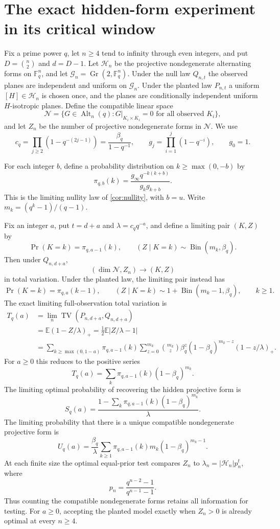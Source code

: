 \section{The exact hidden-form experiment in its critical window}

Fix a prime power $q$, let $n\ge4$ tend to infinity through even integers, and
put $D=\binom n2$ and $d=D-1$. Let $\mathcal H_n$ be the projective
nondegenerate alternating forms on $\mathbb F_q^n$, and let
$\mathcal G_n=\operatorname{Gr}(2,\mathbb F_q^n)$. Under the null law
$Q_{n,t}$ the observed planes are independent and uniform on $\mathcal G_n$.
Under the planted law $P_{n,t}$ a uniform $[H]\in\mathcal H_n$ is chosen
once, and the planes are conditionally independent uniform $H$-isotropic
planes. Define the compatible linear space
\[
 \mathcal N=\{G\in\operatorname{Alt}_n(q):G|_{K_i\times K_i}=0
                 \text{ for all observed }K_i\},
\]
and let $Z_n$ be the number of projective nondegenerate forms in
$\mathcal N$. We use
\[
 c_q=\prod_{j\ge2}(1-q^{-(2j-1)})=\frac{\beta_q}{1-q^{-1}},
 \qquad g_j=\prod_{i=1}^j(1-q^{-i}),\qquad g_0=1.
\]

For each integer $b$, define a probability distribution on
$k\ge\max(0,-b)$ by
\[
 \pi_{q,b}(k)=\frac{g_\infty q^{-k(k+b)}}{g_kg_{k+b}}.
\]
This is the limiting nullity law of \cref{cor:nullity}, with $b=u$. Write
$m_k=(q^k-1)/(q-1)$.

\begin{theorem}
\label{thm:complete-critical-law}
Fix an integer $a$, put $t=d+a$ and $\lambda=c_qq^{-a}$, and define a
limiting pair $(K,Z)$ by
\[
 \Pr(K=k)=\pi_{q,a-1}(k),\qquad
 (Z\mid K=k)\sim\operatorname{Bin}(m_k,\beta_q).
\]
Then under $Q_{n,d+a}$,
\[
 (\dim\mathcal N,Z_n)\longrightarrow(K,Z)
\]
in total variation. Under the planted law, the limiting pair instead has
\[
 \Pr(K=k)=\pi_{q,a}(k-1),\qquad
 (Z\mid K=k)\sim1+\operatorname{Bin}(m_k-1,\beta_q),
 \qquad k\ge1.
\]
The exact limiting full-observation total variation is
\begin{align*}
 T_q(a)
 &=\lim_n\operatorname{TV}(P_{n,d+a},Q_{n,d+a})\\
 &=\mathbb E(1-Z/\lambda)_+
  =\frac12\mathbb E|Z/\lambda-1|\\
 &=\sum_{k\ge\max(0,1-a)}\pi_{q,a-1}(k)
   \sum_{z=0}^{m_k}\binom{m_k}{z}\beta_q^z(1-\beta_q)^{m_k-z}
                         (1-z/\lambda)_+.
\end{align*}
For $a\ge0$ this reduces to the positive series
\[
 T_q(a)=\sum_k\pi_{q,a-1}(k)(1-\beta_q)^{m_k}.
\]
The limiting optimal probability of recovering the hidden projective form is
\[
 S_q(a)=\frac{1-\sum_k\pi_{q,a-1}(k)(1-\beta_q)^{m_k}}{\lambda}.
\]
The limiting probability that there is a unique compatible nondegenerate
projective form is
\[
 U_q(a)=\frac{\beta_q}{\lambda}
     \sum_{k\ge1}\pi_{q,a-1}(k)m_k(1-\beta_q)^{m_k-1}.
\]
At each finite size the optimal equal-prior test compares $Z_n$ to
$\lambda_n=|\mathcal H_n|p_n^t$, where
\[
 p_n=\frac{q^{n-2}-1}{q^{n-1}-1}.
\]
Thus counting the compatible nondegenerate forms retains all information
for testing. For $a\ge0$, accepting the planted model exactly when
$Z_n>0$ is already optimal at every $n\ge4$.
\end{theorem}


